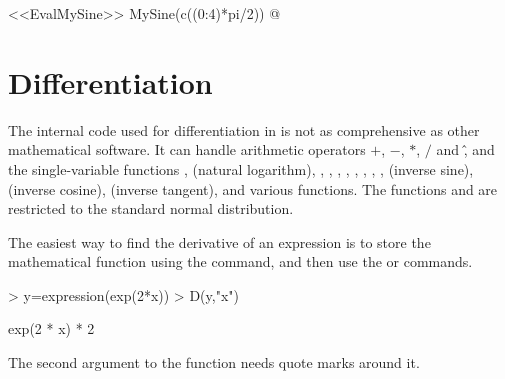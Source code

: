 <<EvalMySine>> 
MySine(c((0:4)*pi/2)) 
@ 

 
 
 
\section{Differentiation} 
 
The internal code used for differentiation in \R{} is not as comprehensive as other mathematical software. 
It can handle arithmetic operators $+$, $-$, $*$, $/$ and \^, and the single-variable functions ,  (natural logarithm), , , , , , , , 
,  (inverse sine),  (inverse cosine),  (inverse tangent), and various  functions. The functions  and  are restricted to the standard normal distribution. 
 
The easiest way to find the derivative of an expression is to store the mathematical function using the  command, and then use the  or  commands. 

\begin{Schunk}
\begin{Sinput}
> y=expression(exp(2*x)) 
> D(y,"x") 
\end{Sinput}
\begin{Soutput}
exp(2 * x) * 2
\end{Soutput}
\end{Schunk}

The second argument to the  function needs quote marks around it. 
 

